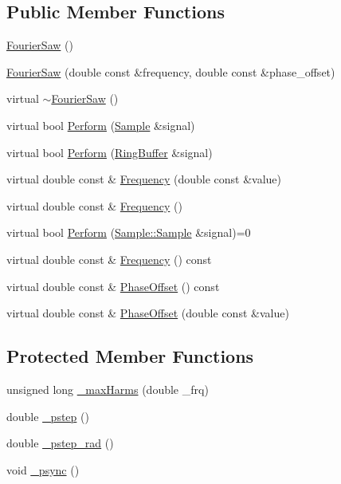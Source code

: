 \subsection*{Public Member Functions}
\begin{DoxyCompactItemize}
\item 
\hyperlink{classDSG_1_1FourierSaw_ac4d5bde5f7ed868abda94cffe32ce4cb}{Fourier\+Saw} ()
\item 
\hyperlink{classDSG_1_1FourierSaw_a9a0bc3906f29e8967da69287012d90d3}{Fourier\+Saw} (double const \&frequency, double const \&phase\+\_\+offset)
\item 
virtual \hyperlink{classDSG_1_1FourierSaw_aa542b5b69e4046fcf0c48f052cb5975d}{$\sim$\+Fourier\+Saw} ()
\item 
virtual bool \hyperlink{classDSG_1_1FourierSaw_a3cc372cd7dd694f8b9cb70e504dd04a1}{Perform} (\hyperlink{classDSG_1_1Sample}{Sample} \&signal)
\item 
virtual bool \hyperlink{classDSG_1_1FourierSaw_a76b78874feebbc89d00656fec4bfd57a}{Perform} (\hyperlink{classDSG_1_1RingBuffer}{Ring\+Buffer} \&signal)
\item 
virtual double const \& \hyperlink{classDSG_1_1FourierSaw_a929602365c9b29f30f523fa07a29966e}{Frequency} (double const \&value)
\item 
virtual double const \& \hyperlink{classDSG_1_1FourierSaw_a427afe0a006b15ebbd29076a12946c55}{Frequency} ()
\item 
virtual bool \hyperlink{classDSG_1_1SignalProcess_afdb8220100418893950c1161dd24db67}{Perform} (\hyperlink{classDSG_1_1Sample_aaf2e30d73911eccea99b53eeee15b612}{Sample\+::\+Sample} \&signal)=0
\item 
virtual double const \& \hyperlink{classDSG_1_1SignalGenerator_aedac746c5a70818d120858542ecb7c45}{Frequency} () const 
\item 
virtual double const \& \hyperlink{classDSG_1_1SignalGenerator_a1ce521847edd0b837fd840998f906b4b}{Phase\+Offset} () const 
\item 
virtual double const \& \hyperlink{classDSG_1_1SignalGenerator_a08b71b1f30ba65e629642c570291dc0e}{Phase\+Offset} (double const \&value)
\end{DoxyCompactItemize}
\subsection*{Protected Member Functions}
\begin{DoxyCompactItemize}
\item 
unsigned long \hyperlink{classDSG_1_1FourierGenerator_a6b6e3bbad8ff7443d9ed71f4cdf76739}{\+\_\+max\+Harms} (double \+\_\+frq)
\item 
double \hyperlink{classDSG_1_1SignalGenerator_ac0d781b8673b3a283bf7c133290ede50}{\+\_\+pstep} ()
\item 
double \hyperlink{classDSG_1_1SignalGenerator_ae660eb4caa88b8d278f8d24d0908a487}{\+\_\+pstep\+\_\+rad} ()
\item 
void \hyperlink{classDSG_1_1SignalGenerator_a05baccb38d1e52860d4fcf7cb8430efc}{\+\_\+psync} ()
\end{DoxyCompactItemize}

